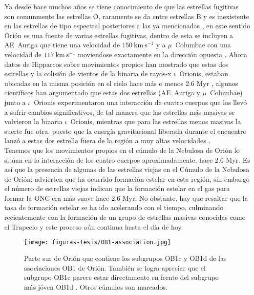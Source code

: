 Ya desde hace muchos años se tiene conocimiento de que las estrellas fugitivas son comunmente las estrellas O, raramente se da entre estrellas B y es inexistente en las estrellas de tipo espectral posteriores a las ya mencionadas \citep{Gies:1986, Gies:1987}, en este sentido Orión es una fuente de varias estrellas fugitivas, dentro de esta se incluyen a AE~Auriga que tiene una velocidad de \(150~\text{km}~\text{s}^{-1}\)  y a \(\mu\)~Columbae con una velocidad de \(117~\text{km}~\text{s}^{-1}\) moviendose exactamente en la dirección opuesta \citep{Blaauw:1991}. Ahora datos de Hipparcos sobre movimientos propios han mostrado que estas dos estrellas y la colisión de vientos de la binaria de rayos-x \(\iota\)~Orionis, estaban ubicadas en la misma posición en el cielo hace más o menos 2.6 Myr \citep{Hoogerwerf:2001}, algunos científicos han argumentado que estas dos estrellas (AE~Auriga y  \(\mu\)~Columbae) junto a \(\iota\)~Orionis experimentaron una interacción de cuatro cuerpos que los llevó a sufrir cambios significativos, de tal manera que las estrellas más masivas se volvieron la binaria \(\iota\)~Orionis, mientras que para las estrellas menos masivas la suerte fue otra, puesto que la energía gravitacional liberada durante el encuentro lanzó a estas dos estrella fuera de la región a muy altas velocidades \citep{Gualandris:2004}.\\   

Tenemos que los movimientos propios en el cúmulo de la Nebulosa de Orión lo sitúan en la interacción de los cuatro cuerpos aproximadamente, hace 2.6 Myr. Es así que la presencia de algunas de las estrellas viejas en el Cúmulo de la Nebulosa de Orión; advierten que ha ocurrido formación estelar en esta región, sin embargo el número de estrellas viejas indican que la formación estelar en el gas para formar la ONC era más suave hace 2.6 Myr. No obstante, hay que resaltar que la tasa de formación estelar se ha ido acelerando con el tiempo, culminando recientemente con la formación de un grupo de estrellas masivas conocidas como el Trapecio y este proceso aún continua hasta el día de hoy.\\

\begin{figure}
  \centering
  \texttt{[image: figuras-tesis/OB1-association.jpg]}
  \caption{Parte sur de  Orión que contiene los subgrupos OB1c y OB1d de las asociaciones OB1 de Orión. También se logra apreciar que el subgrupo OB1c parece estar directamente en frente del subgrupo más jóven OB1d \citep{Bally:2008a}. Otros cúmulos son marcados.}
  \label{fig:OB1-association}
\end{figure}
  

